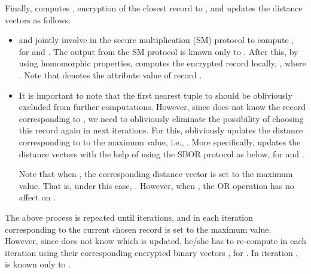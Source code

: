 \documentclass{article}
\begin{document}
Finally,  computes , encryption of the closest record 
to , and updates the distance vectors as follows: 
\begin{itemize}
\item  and  jointly involve in the secure multiplication (SM) protocol to compute 
, for  and .  The output  from the SM protocol is known only 
to . After this, by using homomorphic properties,  computes the 
encrypted record  locally, 
, where . Note that  
denotes the  attribute value of record .
\item It is important to note that the first nearest tuple to  should be 
obliviously excluded from further computations. However, since  does not 
know the record corresponding to , we need to obliviously eliminate 
the possibility of choosing this record again in next iterations. For this, 
 obliviously updates the distance corresponding to   
to the maximum value, i.e., . More specifically,  updates the distance vectors 
with the help of  using the SBOR protocol as below, for  and .
\begin{center}\end{center}
Note that when , the corresponding distance vector  is set 
to the maximum value. That is, under this case, . 
However, when , the OR operation has no affect on . 
\end{itemize} 
The above process is repeated until  iterations, and in each iteration  corresponding 
to the current chosen record is set to the maximum value. However, since  does 
not know which  is updated, he/she has to re-compute  in each iteration using 
their corresponding encrypted binary vectors , for . 
In iteration ,  is known only to .
\end{document}
